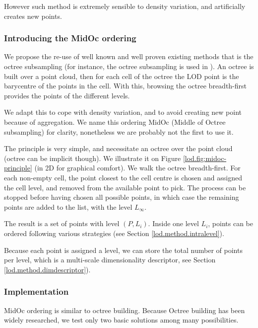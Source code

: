 		However such method is extremely sensible to density variation, and artificially creates new points. 
		
		\subsubsection{Introducing the MidOc ordering}
		
		
		We propose the re-use of well known and well proven existing methods that is the octree subsampling (for instance, the octree subsampling is used in \cite{Girardeau-Montaut2014}).
		An octree is built over a point cloud, then for each cell of the octree the LOD point is the barycentre of the points in the cell.  With this, browsing the octree breadth-first provides the points of the different levels.
		
		We adapt this to cope with density variation, and to avoid creating new point because of aggregation.   
		We name this ordering MidOc (Middle of Octree subsampling) for clarity, nonetheless we are probably not the first to use it.
		
		The principle is very simple, and necessitate an octree over the point cloud (octree can be implicit though).
		We illustrate it on Figure \ref{lod.fig:midoc-principle} (in 2D for graphical comfort).
		We walk the octree breadth-first.
		For each non-empty cell, the point closest to the cell centre is chosen and assigned the cell level,
		and removed from the available point to pick.
		The process can be stopped before having chosen all possible points,
		in which case the remaining points are added to the list, with the level $L_\infty$.
		
		The result is a set of points with level $(P,L_i)$.
		Inside one level $L_i$, points can be ordered following various strategies (see Section \ref{lod.method.intralevel}).
		
		Because each point is assigned a level, we can store the total number of points per level, which is a multi-scale dimensionality descriptor, see Section \ref{lod.method.dimdescriptor}).
		
		\subsubsection{Implementation}
		\label{lod.method.midoc.implementation}
		MidOc ordering is similar to octree building. Because Octree building has been widely researched, we test only two basic solutions among many possibilities.
		
